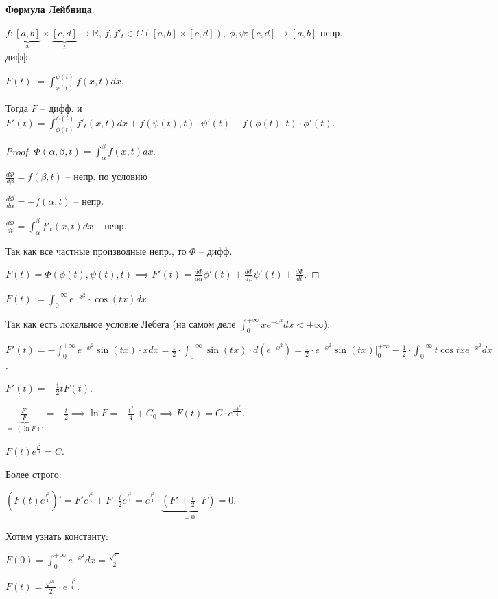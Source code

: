 \begin{theorem}
    \textbf{Формула Лейбница}.

    $f: \underbrace{[a, b]}_{x} \times \underbrace{[c, d]}_{t} \rightarrow \mathbb{R}$, $f, f'_t \in C([a, b] \times [c, d]), \ \phi, \psi : [c, d] \rightarrow [a, b]$ непр. дифф.

    $F(t) := \int_{\phi(t)}^{\psi(t)} { f(x, t) d x }$.

    Тогда $F$ -- дифф. и $F'(t) = \int_{\phi(t)}^{\psi(t)} { f'_t (x, t) dx } + f (\psi(t), t) \cdot \psi'(t) - f(\phi(t), t) \cdot \phi'(t)$.
\end{theorem}
\begin{proof}
    $\Phi(\alpha, \beta, t) = \int_{\alpha}^{\beta} {f(x, t) d x}$.

    $\frac{d\Phi}{d \beta} = f(\beta, t)$ -- непр. по условию
    
    $\frac{d\Phi}{d \alpha} = -f(\alpha, t)$ -- непр.

    $\frac{d \Phi}{d t} = \int_{\alpha}^{\beta} {f'_t (x, t) d x}$ -- непр.

    Так как все частные производные непр., то $\Phi$ -- дифф.

    $F(t) = \Phi(\phi(t), \psi(t), t) \implies F'(t) = \frac{d \Phi}{d \alpha} \phi'(t) + \frac{d \Phi}{d \beta} \psi'(t) + \frac{d\Phi}{dt}$.
\end{proof}

\begin{example}
    $F(t) := \int_{0}^{+\infty} {e^{-x^2} \cdot \cos(tx) dx}$

    Так как есть локальное условие Лебега (на самом деле $\int_{0}^{+\infty} { x e^{-x^2} d x } < +\infty$):

    $F'(t) = -\int_{0}^{+\infty} { e^{-x^2} \sin(tx) \cdot x dx } = \frac{1}{2} \cdot \int_{0}^{+\infty} { \sin(tx) \cdot d (e^{-x^2}) } = \frac{1}{2} \cdot e^{-x^2} \sin(tx) |_{0}^{+\infty} - \frac{1}{2} \cdot \int_{0}^{+\infty} { t \cos{tx} e^{-x^2} dx }$.

    $F'(t) = -\frac{1}{2} t F(t)$.
    
    $\underbrace{\frac{F'}{F}}_{= \ (\ln{F})'} = -\frac{t}{2} \implies \ln{F} = -\frac{t^2}{4} + C_0 \implies F(t) = C \cdot e^{\frac{-t^2}{4}}$.

    $F(t) e^{\frac{t^2}{4}} = C$.

    Более строго:

    $\left( F(t) e^{\frac{t^2}{4}} \right)' = F' e^{\frac{t^2}{4}} + F \cdot \frac{t}{2} e^{\frac{t^2}{4}} = e^{\frac{t^2}{4}} \cdot \underbrace{(F' + \frac{t}{2} \cdot F)}_{= 0} = 0$.

    Хотим узнать константу:

    $F(0) = \int_{0}^{+\infty} { e^{-x^2} dx } = \frac{\sqrt{\pi}}{2}$

    $F(t) = \frac{\sqrt{\pi}}{2} \cdot e^{\frac{-t^2}{4}}$.
\end{example}



